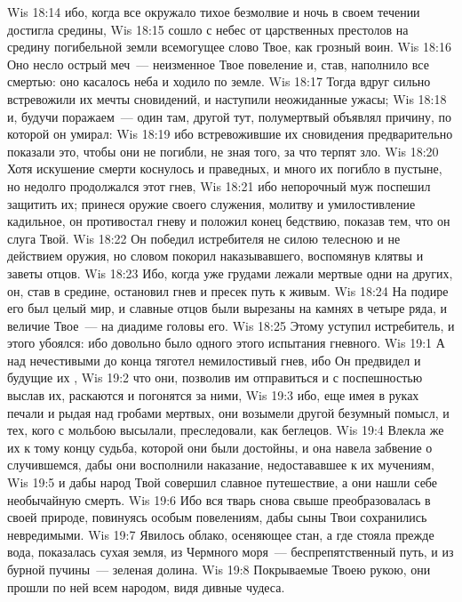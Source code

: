 \vs Wis 18:14 ибо, когда все окружало тихое безмолвие и ночь в своем течении достигла средины,
\vs Wis 18:15 сошло с небес от царственных престолов на средину погибельной земли всемогущее слово Твое, как грозный воин.
\vs Wis 18:16 Оно несло острый меч~--- неизменное Твое повеление и, став, наполнило все смертью: оно касалось неба и ходило по земле.
\vs Wis 18:17 Тогда вдруг сильно встревожили их мечты сновидений, и наступили неожиданные ужасы;
\vs Wis 18:18 и, будучи поражаем~--- один там, другой тут, полумертвый объявлял причину, по которой он умирал:
\vs Wis 18:19 ибо встревожившие их сновидения предварительно показали  это, чтобы они не погибли, не зная того, за что терпят зло.
\vs Wis 18:20 Хотя искушение смерти коснулось и праведных, и много их погибло в пустыне, но недолго продолжался этот гнев,
\vs Wis 18:21 ибо непорочный муж поспешил защитить их; принеся оружие своего служения, молитву и умилостивление кадильное, он противостал гневу и положил конец бедствию, показав тем, что он слуга Твой.
\vs Wis 18:22 Он победил истребителя не силою телесною и не действием оружия, но словом покорил наказывавшего, воспомянув клятвы и заветы отцов.
\vs Wis 18:23 Ибо, когда уже грудами лежали мертвые одни на других, он, став в средине, остановил гнев и пресек  путь к живым.
\vs Wis 18:24 На подире его был целый мир, и славные  отцов были вырезаны на камнях в четыре ряда, и величие Твое~--- на диадиме головы его.
\vs Wis 18:25 Этому уступил истребитель, и этого убоялся: ибо довольно было одного этого испытания гневного.
\vs Wis 19:1 А над нечестивыми до конца тяготел немилостивый гнев, ибо Он предвидел и будущие их ,
\vs Wis 19:2 что они, позволив им отправиться и с поспешностью выслав их, раскаются и погонятся за ними,
\vs Wis 19:3 ибо, еще имея в руках печали и рыдая над гробами мертвых, они возымели другой безумный помысл, и тех, кого с мольбою высылали, преследовали, как беглецов.
\vs Wis 19:4 Влекла же их к тому концу судьба, которой они были достойны, и она навела забвение о случившемся, дабы они восполнили наказание, недостававшее к их мучениям,
\vs Wis 19:5 и дабы народ Твой совершил славное путешествие, а они нашли себе необычайную смерть.
\vs Wis 19:6 Ибо вся тварь снова свыше преобразовалась в своей природе, повинуясь особым повелениям, дабы сыны Твои сохранились невредимыми.
\vs Wis 19:7 Явилось облако, осеняющее стан, а где стояла прежде вода, показалась сухая земля, из Чермного моря~--- беспрепятственный путь, и из бурной пучины~--- зеленая долина.
\vs Wis 19:8 Покрываемые Твоею рукою, они прошли по ней всем народом, видя дивные чудеса.
